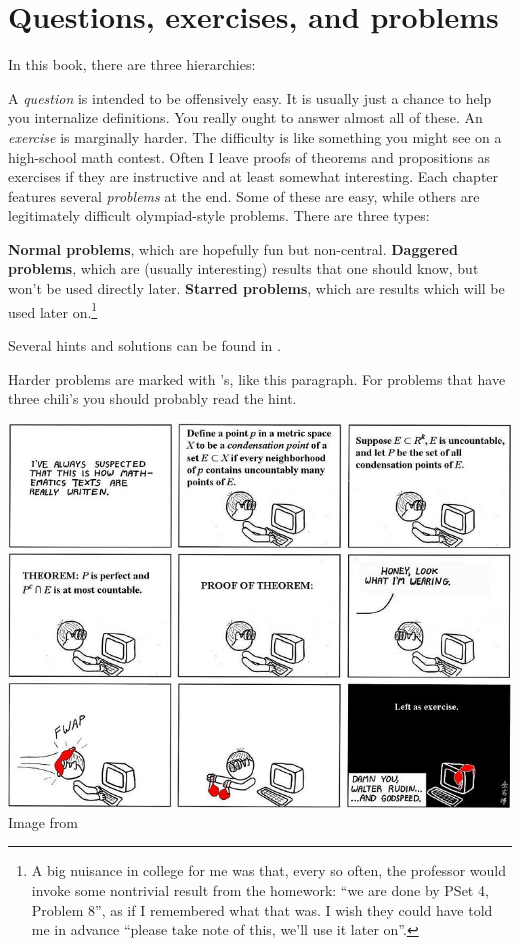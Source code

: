 \eject

\section{Questions, exercises, and problems}
In this book, there are three hierarchies:
\begin{itemize}
	\ii A \emph{question} is intended to be offensively easy.
	It is usually just a chance to help you internalize definitions.
	You really ought to answer almost all of these.
	\ii An \emph{exercise} is marginally harder.
	The difficulty is like something you might see on a high-school math contest.
	Often I leave proofs of theorems and propositions as exercises
	if they are instructive and at least somewhat interesting.
	\ii Each chapter features several \emph{problems} at the end.
	Some of these are easy, while others are
	legitimately difficult olympiad-style problems.
	There are three types:
	\begin{itemize}
		\ii \textbf{Normal problems},
		which are hopefully fun but non-central.
		\ii \textbf{Daggered problems},
		which are (usually interesting) results that one should know,
		but won't be used directly later.
		\ii \textbf{Starred problems},
		which are results which will be used later on.\footnote{%
			A big nuisance in college for me was that,
			every so often, the professor
			would invoke some nontrivial result from the homework:
			``we are done by PSet 4, Problem 8'',
			as if I remembered what that was.
			I wish they could have told me in advance
			``please take note of this, we'll use it later on''.
		}
	\end{itemize}
\end{itemize}
Several hints and solutions can be found in .

\gim
Harder problems are marked with \chili's, like this paragraph.
For problems that have three chili's you should probably read the hint.

\begin{center}
	\includegraphics[width=14cm]{media/abstruse-goose-exercise.png}
	\\ \scriptsize Image from \cite{img:exercise}
\end{center}

